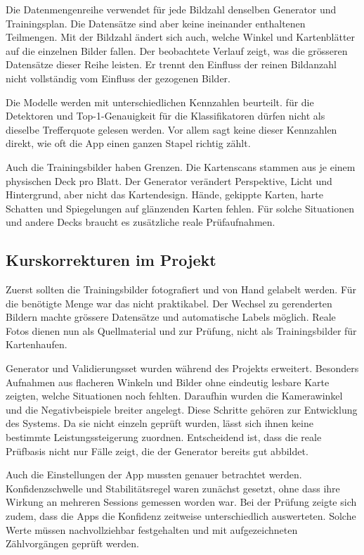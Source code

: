 Die Datenmengenreihe verwendet für jede Bildzahl denselben Generator
und Trainingsplan. Die Datensätze sind aber keine ineinander
enthaltenen Teilmengen. Mit der Bildzahl ändert sich auch, welche
Winkel und Kartenblätter auf die einzelnen Bilder fallen. Der
beobachtete Verlauf zeigt, was die grösseren Datensätze dieser Reihe
leisten. Er trennt den Einfluss der reinen Bildanzahl nicht vollständig
vom Einfluss der gezogenen Bilder.

Die Modelle werden mit unterschiedlichen Kennzahlen beurteilt.
 für die Detektoren und Top-1-Genauigkeit für die
Klassifikatoren dürfen nicht als dieselbe Trefferquote gelesen
werden. Vor allem sagt keine dieser Kennzahlen direkt, wie oft die
App einen ganzen Stapel richtig zählt.

Auch die Trainingsbilder haben Grenzen. Die Kartenscans stammen aus je
einem physischen Deck pro Blatt. Der Generator verändert Perspektive,
Licht und Hintergrund, aber nicht das Kartendesign. Hände, gekippte
Karten, harte Schatten und Spiegelungen auf glänzenden Karten fehlen.
Für solche Situationen und andere Decks braucht es zusätzliche reale
Prüfaufnahmen.

\subsection{Kurskorrekturen im Projekt}\label{sec:verworfen}

Zuerst sollten die Trainingsbilder fotografiert und von Hand gelabelt
werden. Für die benötigte Menge war das nicht praktikabel. Der Wechsel
zu gerenderten Bildern machte grössere Datensätze und automatische
Labels möglich. Reale Fotos dienen nun als Quellmaterial und zur
Prüfung, nicht als Trainingsbilder für Kartenhaufen.

Generator und Validierungsset wurden während des Projekts erweitert.
Besonders Aufnahmen aus flacheren Winkeln und Bilder ohne eindeutig
lesbare Karte zeigten, welche Situationen noch fehlten. Daraufhin
wurden die Kamerawinkel und die Negativbeispiele breiter angelegt.
Diese Schritte gehören zur Entwicklung des Systems. Da sie nicht
einzeln geprüft wurden, lässt sich ihnen keine bestimmte
Leistungssteigerung zuordnen. Entscheidend ist, dass die reale
Prüfbasis nicht nur Fälle zeigt, die der Generator bereits gut
abbildet.

Auch die Einstellungen der App mussten genauer betrachtet werden.
Konfidenzschwelle und Stabilitätsregel waren zunächst gesetzt, ohne
dass ihre Wirkung an mehreren Sessions gemessen worden war. Bei der
Prüfung zeigte sich zudem, dass die Apps die Konfidenz zeitweise
unterschiedlich auswerteten. Solche Werte müssen nachvollziehbar
festgehalten und mit aufgezeichneten Zählvorgängen geprüft werden.

